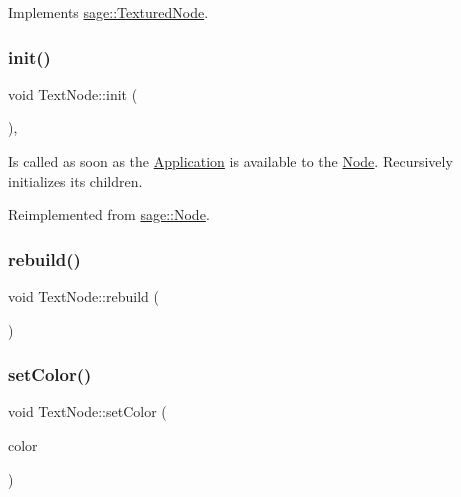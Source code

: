 Implements \mbox{\hyperlink{classsage_1_1TexturedNode_a079cea0b12a1d0e3ea69459546736c0f}{sage\+::\+Textured\+Node}}.

\mbox{\label{classsage_1_1TextNode_ae389b7b4afae4d068ac29686343f279e}} 
\subsubsection{\texorpdfstring{init()}{init()}}
{\footnotesize\ttfamily void Text\+Node\+::init (\begin{DoxyParamCaption}{ }\end{DoxyParamCaption})\hspace{0.3cm}{\ttfamily [override]}, {\ttfamily [virtual]}}



Is called as soon as the \mbox{\hyperlink{classsage_1_1Application}{Application}} is available to the \mbox{\hyperlink{classsage_1_1Node}{Node}}. Recursively initializes its children. 



Reimplemented from \mbox{\hyperlink{classsage_1_1Node_ab87776adae83149e235e37ed469f4e10}{sage\+::\+Node}}.

\mbox{\label{classsage_1_1TextNode_a7984e4a663f48338da018b780704b95f}} 
\subsubsection{\texorpdfstring{rebuild()}{rebuild()}}
{\footnotesize\ttfamily void Text\+Node\+::rebuild (\begin{DoxyParamCaption}{ }\end{DoxyParamCaption})\hspace{0.3cm}{\ttfamily [protected]}}

\mbox{\label{classsage_1_1TextNode_a46a1738c681f158ab1d2468d3ec02a24}} 
\subsubsection{\texorpdfstring{setColor()}{setColor()}}
{\footnotesize\ttfamily void Text\+Node\+::set\+Color (\begin{DoxyParamCaption}\item[{S\+D\+L\+\_\+\+Color}]{color }\end{DoxyParamCaption})}

